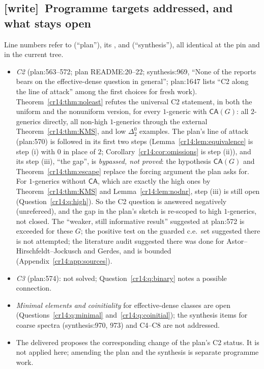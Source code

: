 \documentclass[11pt,a4paper]{article}
\newcommand{\CA}{\mathsf{CA}}
\theoremstyle{definition}
\theoremstyle{remark}
\newcommand{\wtag}{\textup{[write]}}
\begin{document}
\subsection{\wtag\ Programme targets addressed, and what stays open}
\label{cr14:sec:wtargets}
Line numbers refer to
(``plan''), its , and
 (``synthesis''),
all identical at the pin and in the current tree.
\begin{itemize}
\item \emph{C2} (plan:563--572; plan README:20--22; synthesis:969, ``None of
the reports bears on the effective-dense question in general''; plan:1647
lists ``C2 along the line of attack'' among the first choices for fresh
work). Theorem~\ref{cr14:thm:noleast} refutes the universal C2 statement,
in both the uniform and the nonuniform version, for every $1$-generic with
$\CA(G)$: all $2$-generics directly, all non-high $1$-generics through the
external Theorem~\ref{cr14:thm:KMS}, and low $\Delta^0_2$ examples. The
plan's line of attack (plan:570) is followed in its first two steps
(Lemma~\ref{cr14:lem:equivalence} is step (i) with $0$ in place of $2$;
Corollary~\ref{cr14:cor:omissions} is step (ii)), and its step (iii), ``the
gap'', is \emph{bypassed, not proved}: the hypothesis $\CA(G)$ and
Theorem~\ref{cr14:thm:escape} replace the forcing argument the plan asks
for. For $1$-generics without $\CA$, which are exactly the high ones by
Theorem~\ref{cr14:thm:KMS} and Lemma~\ref{cr14:lem:nodnr}, step (iii) is
still open (Question~\ref{cr14:q:high}). So the C2 question is answered
negatively (unrefereed), and the gap in the plan's sketch is re-scoped to
high $1$-generics, not closed. The ``weaker, still informative result''
suggested at plan:572 is exceeded for these $G$; the positive test on the
guarded c.e.\ set suggested there is not attempted; the literature audit
suggested there was done for Astor--Hirschfeldt--Jockusch and Gerdes, and
is bounded (Appendix~\ref{cr14:app:sources}).
\item \emph{C3} (plan:574): not solved; Question~\ref{cr14:q:binary} notes a
possible connection.
\item \emph{Minimal elements and coinitiality} for effective-dense classes
are open (Questions~\ref{cr14:q:minimal} and~\ref{cr14:q:coinitial}); the
synthesis items for coarse spectra (synthesis:970, 973) and C4--C8 are not
addressed.
\item The delivered  proposes the corresponding
change of the plan's C2 status. It is not applied here; amending the plan
and the synthesis is separate programme work.
\end{itemize}
\end{document}
